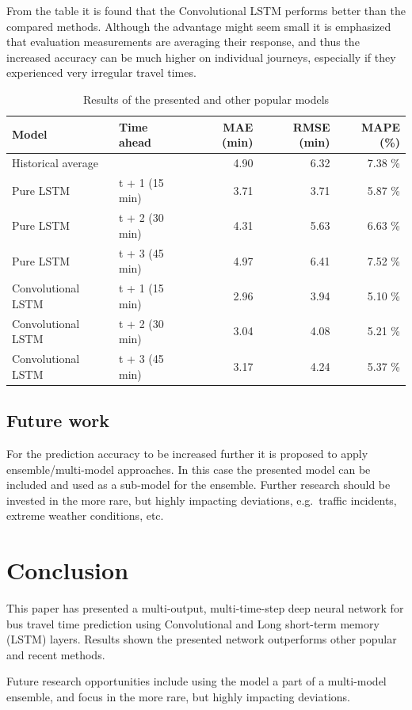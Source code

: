 \documentclass[preprint,12pt]{elsarticle}
\begin{document}
From the table it is found that the Convolutional LSTM performs better than the compared methods. Although the advantage might seem small it is emphasized that evaluation measurements are averaging their response, and thus the increased accuracy can be much higher on individual journeys, especially if they experienced very irregular travel times.

\begin{table}[!ht]
    \caption{Results of the presented and other popular models}
    \label{tab:results}
    \center
    \begin{tabular}{ll|rrr}
        Model & Time ahead & MAE (min) & RMSE (min) & MAPE (\%) \\
        \hline 
        Historical average &                & 4.90 & 6.32 & 7.38 \% \\ 
        \hline 
        Pure LSTM          & t + 1 (15 min) & 3.71 & 3.71 & 5.87 \% \\
        Pure LSTM          & t + 2 (30 min) & 4.31 & 5.63 & 6.63 \% \\
        Pure LSTM          & t + 3 (45 min) & 4.97 & 6.41 & 7.52 \% \\
        \hline 
        Convolutional LSTM & t + 1 (15 min) & 2.96 & 3.94 & 5.10 \% \\
        Convolutional LSTM & t + 2 (30 min) & 3.04 & 4.08 & 5.21 \% \\
        Convolutional LSTM & t + 3 (45 min) & 3.17 & 4.24 & 5.37 \% \\
        \hline 
    \end{tabular}
\end{table}

\subsection{Future work}
For the prediction accuracy to be increased further it is proposed to apply ensemble/multi-model approaches. In this case the presented model can be included and used as a sub-model for the ensemble. Further research should be invested in the more rare, but highly impacting deviations, e.g.\ traffic incidents, extreme weather conditions, etc.

\section{Conclusion}
\label{sec:conclusion}
This paper has presented a multi-output, multi-time-step deep neural network for bus travel time prediction using Convolutional and Long short-term memory (LSTM) layers. Results shown the presented network outperforms other popular and recent methods.

Future research opportunities include using the model a part of a multi-model ensemble, and focus in the more rare, but highly impacting deviations.

\newpage


%

\end{document}
